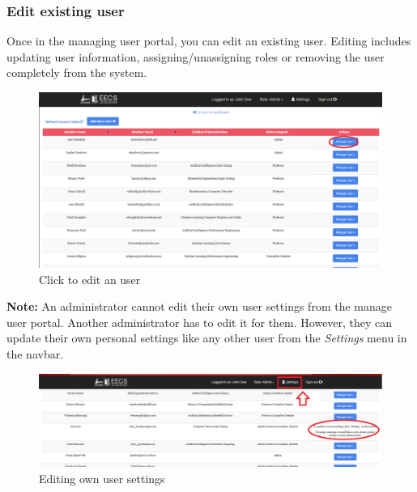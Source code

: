 \documentclass[fontsize=12pt,paper=letter,twoside]{scrartcl}
\begin{document}
\clearpage
\subsubsection{Edit existing user}
Once in the managing user portal, you can edit an existing user. Editing includes updating user information, assigning/unassigning roles or removing the user completely from the system.

\begin{figure}[!htb]
\begin{center}
\includegraphics[width=.99\textwidth]{images/adm/mu/edit_user.png}
\end{center}
\caption{Click to edit an user}
\label{fig:adm/edit_user}
\end{figure}

\smallskip
\noindent \textbf{Note:} An administrator cannot edit their own user settings from the manage user portal. Another administrator has to edit it for them. However, they can update their own personal settings like any other user from the \emph{Settings} menu in the navbar. 

\begin{figure}[!htb]
\begin{center}
\includegraphics[width=.99\textwidth]{images/adm/mu/edit_own_user.png}
\end{center}
\caption{Editing own user settings}
\label{fig:adm/edit_own_user}
\end{figure}

\clearpage
\end{document}
